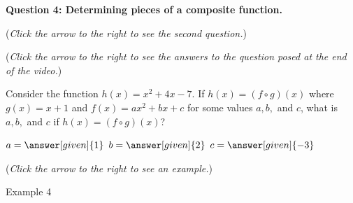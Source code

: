 \documentclass{ximera}
\begin{document}
\textbf{Question 4: Determining pieces of a composite function.}
\begin{question}
\begin{flushright}
{\color{blue}(\emph{Click the arrow to the right to see the second question.})}
\end{flushright}
\begin{center}
\begin{expandable}
{\color{blue}(\emph{Click the arrow to the right to see the answers 
to the question posed at the end of the video.})}
\begin{expandable}
Consider the function $h(x) = x^2 + 4x - 7$. If $h(x) = (f\circ g)(x)$
where $g(x) = x+1$ and $f(x) = ax^2 + bx + c$ for some values $a,b,$
and $c$, what is $a, b,$ and $c$ if $h(x) = (f\circ g)(x)$?
\begin{prompt}
    $a = \answer[given]{1} $
    $b = \answer[given]{2} $
    $c = \answer[given]{-3} $
\end{prompt}

\begin{flushright}
{\color{blue}(\emph{Click the arrow to the right to see an example.})}
\end{flushright}
\begin{expandable}
Example 4
\end{expandable}
\end{expandable}
\end{expandable}
\end{center}
\end{question}
\end{document}
